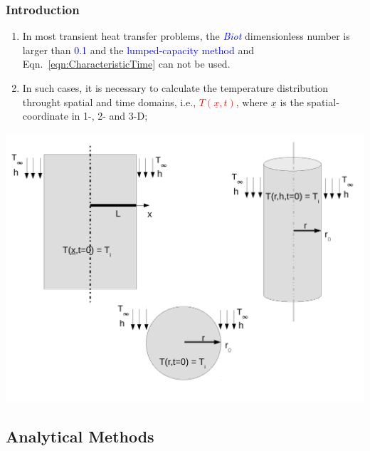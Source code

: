 \documentclass[10pt,compress,unknownkeysallowed]{beamer}
\newcommand{\red}{\textcolor{red}}
\newcommand{\blue}{\textcolor{blue}}
\begin{document}
\begin{frame}
 \frametitle{Introduction}
   \begin{enumerate}%
     \item<1-> In most transient heat transfer problems, the \blue{\it Biot} dimensionless number is larger than \blue{0.1} and the \blue{lumped-capacity method} and Eqn.~\ref{eqn:CharacteristicTime} can not be used.
     \item<2-> In such cases, it is necessary to calculate the temperature distribution throught spatial and time domains, i.e., \red{$T\left(\underline{x},t\right)$}, where $\underline{x}$ is the spatial-coordinate in 1-, 2- and 3-D;
   \end{enumerate}

   \begin{center}
      \includegraphics[width=0.55\columnwidth,height=0.45\columnwidth,clip]{./Pics/HT_All}
   \end{center}
\end{frame}


\subsection{Analytical Methods}
\end{document}
